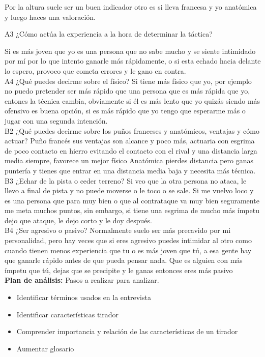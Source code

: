 Por la altura suele ser un buen indicador otro es si lleva francesa y yo anatómica y luego haces
una valoración.

A3 ¿Cómo actúa la experiencia a la hora de determinar la táctica?

Si es más joven que yo es una persona que no sabe mucho y se siente intimidado por mí por lo
que intento ganarle más rápidamente, o si esta echado hacia delante lo espero, provoco que
cometa errores y le gano en contra.
\\

A4 ¿Qué puedes decirme sobre el físico?
Si tiene más físico que yo, por ejemplo no puedo pretender ser más rápido que una persona que
es más rápida que yo, entones la técnica cambia, obviamente si él es más lento que yo quizás
siendo más ofensivo es buena opción, si es más rápido que yo tengo que esperarme más o jugar
con una segunda intención.
\\

B2 ¿Qué puedes decirme sobre los puños franceses y anatómicos, ventajas y cómo actuar?
Puño francés sus ventajas son alcance y poco más, actuaria con esgrima de poco contacto en
hierro evitando el contacto con el rival y una distancia larga media siempre, favorece un mejor
físico
Anatómica pierdes distancia pero ganas puntería y tienes que entrar en una distancia media baja
y necesita más técnica.
\\

B3 ¿Echar de la pista o ceder terreno?
Si veo que la otra persona no ataca, le llevo a final de pista y no puede moverse o le toco o se
sale. Si me vuelvo loco y es una persona que para muy bien o que al contrataque va muy bien
seguramente me meta muchos puntos, sin embargo, si tiene una esgrima de mucho más ímpetu
dejo que ataque, le dejo corto y le doy después.
\\

B4 ¿Ser agresivo o pasivo?
Normalmente suelo ser más precavido por mi personalidad, pero hay veces que si eres agresivo
puedes intimidar al otro como cuando tienen menos experiencia que tu o es más joven que tú,
a esa gente hay que ganarle rápido antes de que pueda pensar nada. Que es alguien con más
ímpetu que tú, dejas que se precipite y le ganas entonces eres más pasivo
\\

\textbf{Plan de análisis:} Pasos a realizar para analizar.
\begin{itemize}
  \item Identificar términos usados en la entrevista
  \item Identificar características tirador
  \item Comprender importancia y relación de las características de un tirador
  \item Aumentar glosario
\end{itemize}

